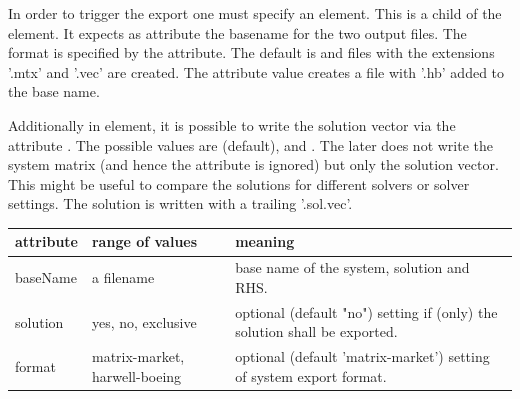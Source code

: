 In order to trigger the export one must specify an 
element.
This is a child of the  element. It expects as 
attribute the basename for the two output files. The format is specified by
the  attribute. The default is  and files
with the extensions '.mtx' and '.vec' are created. The attribute value
 creates a file with '.hb' added to the base name.

Additionally in  element, it is possible to write the
solution vector via the attribute
. The possible values are  (default),
 and
. The later does not write the system matrix (and hence
the
 attribute is ignored) but only the solution vector. This might be
useful to compare the solutions for different solvers or solver settings. The
solution is written with a trailing '.sol.vec'.

\begin{center}
\begin{tabular}{llp{}}
\toprule
attribute & range of values & meaning \\
\midrule
baseName & a filename & base name of the system, solution and RHS. \\
solution & yes, no, exclusive & optional (default "no") setting if (only) the
solution shall be exported.\\
format & matrix-market, harwell-boeing & optional (default 'matrix-market')
setting of system export format. \\
\bottomrule
\end{tabular}
\end{center}

